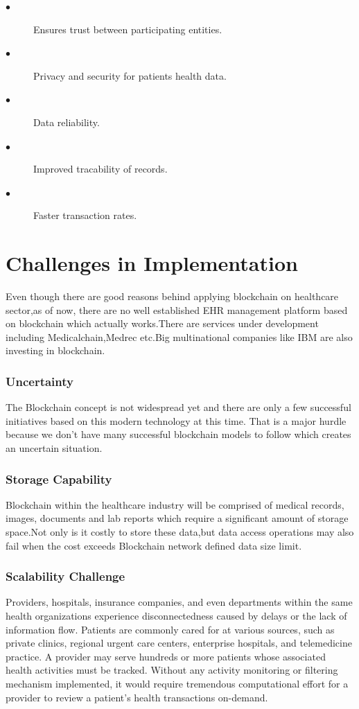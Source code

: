 \documentclass[12pt]{report}
\begin{document}
\begin{description}
\item[$\bullet$]Ensures trust between participating entities.
\item[$\bullet$]Privacy and security for patients health data.
\item[$\bullet$]Data reliability.
\item[$\bullet$]Improved tracability of records.
\item[$\bullet$]Faster transaction rates.
\end{description}

\chapter{Challenges in Implementation}
Even though there are good reasons behind applying blockchain on healthcare sector,as of now, there are no well established EHR management platform based on blockchain which actually works.There are services under development including Medicalchain,Medrec etc.Big multinational companies like IBM are also investing in blockchain.

\subsection{Uncertainty}
The Blockchain concept is not widespread yet and there are only a few successful initiatives based on this modern technology at this time. That is a major hurdle because we don’t have many successful blockchain models to follow which creates an uncertain situation.
\subsection{Storage Capability}
\par Blockchain within the healthcare industry will be comprised of medical records, images, documents and lab reports which require a significant amount of storage space.Not only is it costly to store these data,but data access operations may also fail when the cost exceeds Blockchain network defined
data size limit.
\subsection{Scalability Challenge}
Providers, hospitals, insurance companies, and even departments within the same health organizations experience disconnectedness
caused by delays or the lack of information flow. Patients are commonly cared for at various
sources, such as private clinics, regional urgent care centers, enterprise hospitals, and telemedicine practice. A provider may serve hundreds or more patients whose associated health
activities must be tracked. Without any activity monitoring or filtering mechanism implemented, it would require tremendous computational effort for a provider to review a patient’s
health transactions on-demand.
\end{document}
